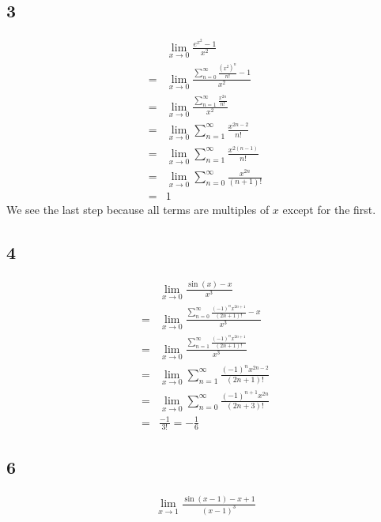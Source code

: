 \documentclass[12pt]{article}
\newcommand{\round}[1]{\left(       #1 \right)      }
\begin{document}
\subsection*{3}
\begin{align*}
     & \lim_{x\to0} \frac{e^{x^2} - 1}{x^2} \\
    =& \lim_{x\to0} \frac{\sum_{n=0}^\infty \frac{\round{x^2}^n}{n!} - 1}{x^2} \\
    =& \lim_{x\to0} \frac{\sum_{n=1}^\infty \frac{x^{2n}}{n!}}{x^2} \\
    =& \lim_{x\to0} \sum_{n=1}^\infty \frac{x^{2n-2}}{n!} \\
    =& \lim_{x\to0} \sum_{n=1}^\infty \frac{x^{2(n-1)}}{n!} \\
    =& \lim_{x\to0} \sum_{n=0}^\infty \frac{x^{2n}}{(n+1)!} \\
    =& 1
\end{align*}
We see the last step because all terms are multiples of $x$ except for the first.

\subsection*{4}
\begin{align*}
     & \lim_{x\to0} \frac{\sin(x) - x}{x^3} \\
    =& \lim_{x\to0} \frac{\sum_{n=0}^\infty \frac{(-1)^n x^{2n+1}}{(2n+1)!} - x}{x^3} \\
    =& \lim_{x\to0} \frac{\sum_{n=1}^\infty \frac{(-1)^n x^{2n+1}}{(2n+1)!}}{x^3} \\
    =& \lim_{x\to0} \sum_{n=1}^\infty \frac{(-1)^n x^{2n-2}}{(2n+1)!} \\
    =& \lim_{x\to0} \sum_{n=0}^\infty \frac{(-1)^{n+1} x^{2n}}{(2n+3)!} \\
    =& \frac{-1}{3!} = -\frac{1}{6}
\end{align*}

\subsection*{6}
\begin{align*}
    \lim_{x\to1} \frac{\sin(x-1) - x + 1}{(x-1)^3}
\end{align*}
\end{document}
